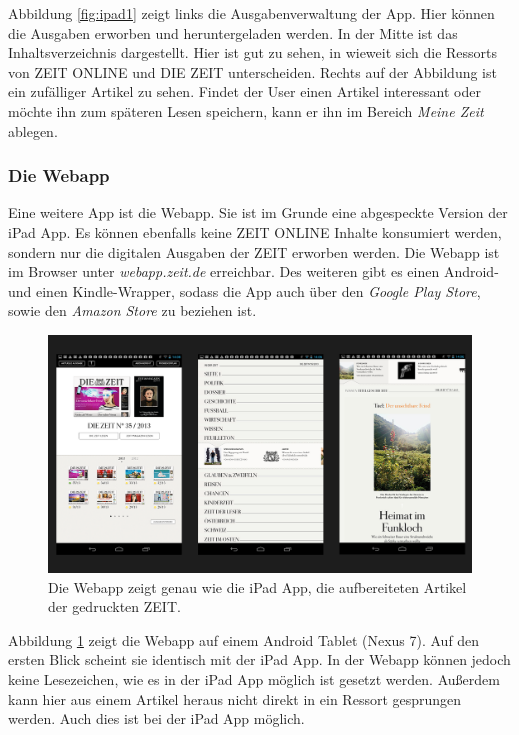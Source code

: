 \documentclass[12pt,a4paper,bibtotoc,abstracton]{scrartcl}
\begin{document}
Abbildung \ref{fig:ipad1} zeigt links die Ausgabenverwaltung der App. Hier können die Ausgaben erworben und heruntergeladen werden. In der Mitte ist das Inhaltsverzeichnis dargestellt. Hier ist gut zu sehen, in wieweit sich die Ressorts von ZEIT ONLINE und DIE ZEIT unterscheiden. Rechts auf der Abbildung ist ein zufälliger Artikel zu sehen. Findet der User einen Artikel interessant oder möchte ihn zum späteren Lesen speichern, kann er ihn im Bereich \textit{Meine Zeit} ablegen. 

\subsubsection{Die Webapp}
\label{subsubsec:webapp}
Eine weitere App ist die Webapp. Sie ist im Grunde eine abgespeckte Version der iPad App. Es können ebenfalls keine ZEIT ONLINE Inhalte konsumiert werden, sondern nur die digitalen Ausgaben der ZEIT erworben werden. Die Webapp ist im Browser unter \textit{webapp.zeit.de} erreichbar. Des weiteren gibt es einen Android- und einen Kindle-Wrapper, sodass die App auch über den \textit{Google Play Store}, sowie den \textit{Amazon Store} zu beziehen ist. 

\begin{figure}[h]	
	\centering
	\includegraphics[width=\textwidth]{Bilder/Screenshots/android-webapp/webapp.png} 
	\caption{Die Webapp zeigt genau wie die iPad App, die aufbereiteten Artikel der gedruckten ZEIT.}
	\label{fig:webapp}
\end{figure}

Abbildung \ref{fig:webapp} zeigt die Webapp auf einem Android Tablet (Nexus 7). Auf den ersten Blick scheint sie identisch mit der iPad App. In der Webapp können jedoch keine Lesezeichen, wie es in der iPad App möglich ist gesetzt werden. Außerdem kann hier aus einem Artikel heraus nicht direkt in ein Ressort gesprungen werden. Auch dies ist bei der iPad App möglich.
\end{document}
